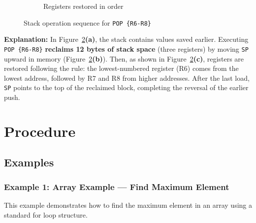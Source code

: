 \begin{figure}[H]
\begin{subfigure}[t]{0.3\textwidth}
    \caption{Registers restored in order}
    \label{fig:stack-sp-update}
\end{subfigure}

\caption{Stack operation sequence for \texttt{POP \{R6-R8\}}}
\label{fig:stack-pop-sequence}
\end{figure}
\noindent\textbf{Explanation:}
In Figure~\ref{fig:stack-pop-sequence}\textbf{(a)}, the stack contains values saved earlier.
Executing \texttt{POP \{R6-R8\}} \textbf{reclaims 12 bytes of stack space} (three registers) by moving \texttt{SP} upward in memory (Figure~\ref{fig:stack-pop-sequence}\textbf{(b)}).
Then, as shown in Figure~\ref{fig:stack-pop-sequence}\textbf{(c)}, registers are restored following the rule: the lowest-numbered register (R6) comes from the lowest address, followed by R7 and R8 from higher addresses.
After the last load, \texttt{SP} points to the top of the reclaimed block, completing the reversal of the earlier push.



\newpage
\section{Procedure}

\subsection{Examples}

\subsubsection{Example 1: Array Example — Find Maximum Element}
This example demonstrates how to find the maximum element in an array using a standard for loop structure.


